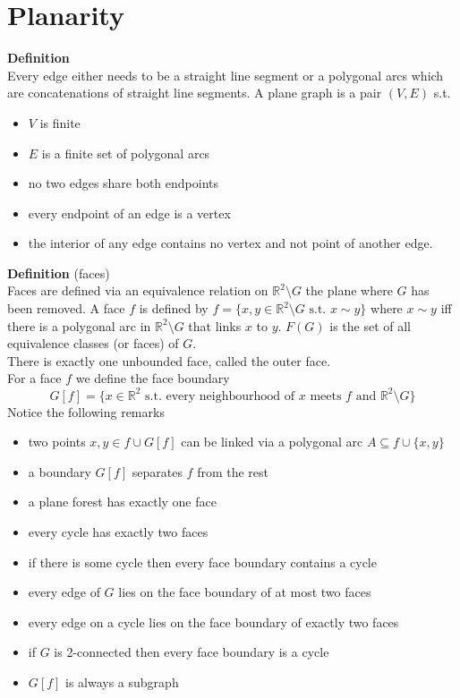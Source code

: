 \documentclass[a4paper, 12pt]{article}
\begin{document}
	\section{Planarity}
	\textbf{Definition}\\
	Every edge either needs to be a straight line segment or a polygonal arcs which are concatenations of straight line segments. A plane graph is a pair $(V,E)$ s.t. \begin{itemize}
		\item $V$ is finite
		\item $E$ is a finite set of polygonal arcs
		\item no two edges share both endpoints
		\item every endpoint of an edge is a vertex
		\item the interior of any edge contains no vertex and not point of another edge.
	\end{itemize}
	\textbf{Definition} (faces)\\
	Faces are defined via an equivalence relation on $\mathbb{R}^2 \setminus G$ the plane where $G$ has been removed. A face $f$ is defined by $f = \{x,y \in \mathbb{R}^2 \setminus G \text{ s.t. } x\sim y\}$ where $x \sim y$ iff there is a polygonal arc in $\mathbb{R}^2 \setminus G$ that links $x$ to $y$. $F(G)$ is the set of all equivalence classes (or faces) of $G$.\\
	There is exactly one unbounded face, called the outer face.\\
	For a face $f$ we define the face boundary \[G[f] = \{x \in \mathbb{R}^2 \text{ s.t. every neighbourhood of $x$ meets $f$ and } \mathbb{R}^2 \setminus G\}\]
	Notice the following remarks \begin{itemize}
		\item two points $x,y \in f \cup G[f]$ can be linked via a polygonal arc $A \subseteq f \cup \{x,y\}$
		\item a boundary $G[f]$ separates $f$ from the rest 
		\item a plane forest has exactly one face
		\item every cycle has exactly two faces
		\item if there is some cycle then every face boundary contains a cycle
		\item every edge of $G$ lies on the face boundary of at most two faces
		\item every edge on a cycle lies on the face boundary of exactly two faces
		\item if $G$ is 2-connected then every face boundary is a cycle 
		\item $G[f]$ is always a subgraph 
	\end{itemize}
\end{document}
